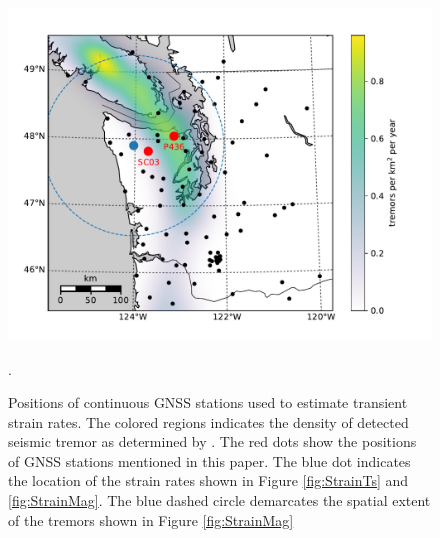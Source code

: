 \documentclass[10pt,letter]{article}
\begin{document}
\begin{figure}
\includegraphics{figures/context_map/context-map.pdf}
\caption{Positions of continuous GNSS stations used to estimate transient strain rates. The colored regions indicates the density of detected seismic tremor as determined by \citet{Wech2010}. The red dots show the positions of GNSS stations mentioned in this paper. The blue dot indicates the location of the strain rates shown in Figure \ref{fig:StrainTs} and \ref{fig:StrainMag}. The blue dashed circle demarcates the spatial extent of the tremors shown in Figure \ref{fig:StrainMag}}.    
\label{fig:Context}
\end{figure}
\end{document}
